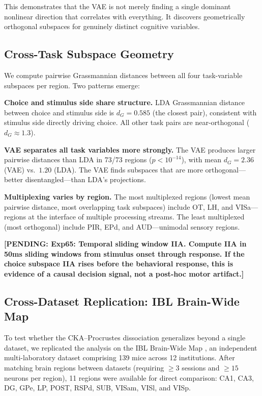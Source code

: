 \documentclass{article}
\newcommand{\pending}[1]{\textcolor{red!70!black}{\textbf{[PENDING: #1]}}}
\begin{document}
This demonstrates that the VAE is not merely finding a single dominant nonlinear direction that correlates with everything. It discovers geometrically orthogonal subspaces for genuinely distinct cognitive variables.

\subsection{Cross-Task Subspace Geometry}

We compute pairwise Grassmannian distances between all four task-variable subspaces per region. Two patterns emerge:

\textbf{Choice and stimulus side share structure.} LDA Grassmannian distance between choice and stimulus side is $d_G = 0.585$ (the closest pair), consistent with stimulus side directly driving choice. All other task pairs are near-orthogonal ($d_G \approx 1.3$).

\textbf{VAE separates all task variables more strongly.} The VAE produces larger pairwise distances than LDA in 73/73 regions ($p < 10^{-14}$), with mean $d_G = 2.36$ (VAE) vs.\ $1.20$ (LDA). The VAE finds subspaces that are more orthogonal---better disentangled---than LDA's projections.

\textbf{Multiplexing varies by region.} The most multiplexed regions (lowest mean pairwise distance, most overlapping task subspaces) include OT, LH, and VISa---regions at the interface of multiple processing streams. The least multiplexed (most orthogonal) include PIR, EPd, and AUD---unimodal sensory regions.

\pending{Exp65: Temporal sliding window IIA. Compute IIA in 50ms sliding windows from stimulus onset through response. If the choice subspace IIA rises before the behavioral response, this is evidence of a causal decision signal, not a post-hoc motor artifact.}

\subsection{Cross-Dataset Replication: IBL Brain-Wide Map}
\label{sec:ibl}

To test whether the CKA--Procrustes dissociation generalizes beyond a single dataset, we replicated the analysis on the IBL Brain-Wide Map \citep{ibl2025brainwide}, an independent multi-laboratory dataset comprising 139 mice across 12 institutions. After matching brain regions between datasets (requiring $\geq 3$ sessions and $\geq 15$ neurons per region), 11 regions were available for direct comparison: CA1, CA3, DG, GPe, LP, POST, RSPd, SUB, VISam, VISl, and VISp.
\end{document}
